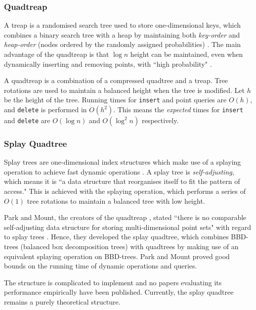 \subsubsection{Quadtreap}

A treap is a randomised search tree used to store one-dimensional keys, which combines a binary search tree with a heap by maintaining both \textit{key-order} and \textit{heap-order} (nodes ordered by the randomly assigned probabilities) \cite{quadtreap}. The main advantage of the quadtreap is that $\log n$ height can be maintained, even when dynamically inserting and removing points, with ``high probability" \cite{quadtreap}.

A quadtreap is a combination of a compressed quadtree and a treap. Tree rotations are used to maintain a balanced height when the tree is modified. Let $h$ be the height of the tree. Running times for \texttt{insert} and point queries are $O(h)$, and \texttt{delete} is performed in $O(h^2)$. This means the \textit{expected} times for \texttt{insert} and \texttt{delete} are $O(\log n)$ and $O(\log^2 n)$ respectively.

\subsubsection{Splay Quadtree}
\label{sec:splay-quadtree}

Splay trees are one-dimensional index structures which make use of a splaying operation to achieve fast dynamic operations \cite{introduction-to-algorithms}. A splay tree is \textit{self-adjusting}, which means it is ``a data structure that reorganises itself to fit the pattern of access." \cite{splay-quadtree} This is achieved with the splaying operation, which performs a series of $O(1)$ tree rotations to maintain a balanced tree with low height.

Park and Mount, the creators of the quadtreap \cite{quadtreap}, stated ``there is no comparable self-adjusting data structure for storing multi-dimensional point sets" with regard to splay trees \cite{splay-quadtree}. Hence, they developed the splay quadtree, which combines BBD-trees (balanced box decomposition trees) with quadtrees by making use of an equivalent splaying operation on BBD-trees. Park and Mount proved good bounds on the running time of dynamic operations and queries.

The structure is complicated to implement and no papers evaluating its performance empirically have been published. Currently, the splay quadtree remains a purely theoretical structure.